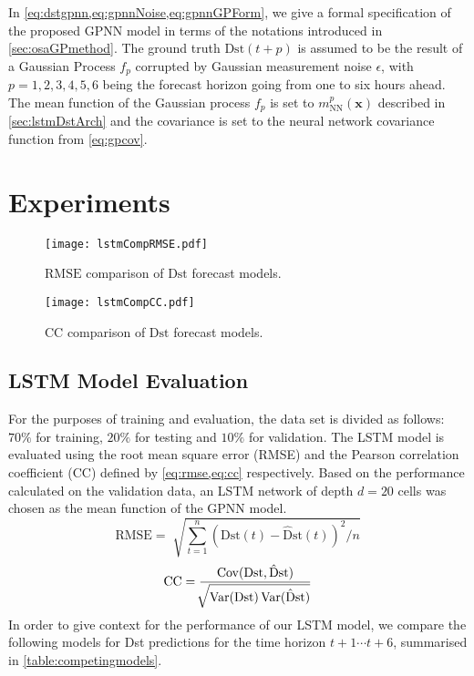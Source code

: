 In \cref{eq:dstgpnn,eq:gpnnNoise,eq:gpnnGPForm}, we give a formal specification of the proposed GPNN model in 
terms of the notations introduced in \cref{sec:osaGPmethod}. The ground truth $\mathrm{Dst}\left(t + p\right)$ 
is assumed to be the result of a Gaussian Process $f_{p}$ corrupted by Gaussian measurement noise $\epsilon$, 
with $p = {1,2,3,4,5,6}$ being the forecast horizon going from one to six hours ahead. The mean function of the 
Gaussian process $f_{p}$ is set to $m^{p}_{\text{NN}} \left( \mathbf{x} \right)$ described in 
\cref{sec:lstmDstArch} and the covariance is set to the neural network covariance function 
from \cref{eq:gpcov}. 


\section{Experiments} \label{sec:resultsgpnn}

\begin{figure}
	\texttt{[image: lstmCompRMSE.pdf]}
	\caption{$\mathrm{RMSE}$ comparison of $\mathrm{Dst}$ forecast models.}
	\label{fig:lstmRMSE}
\end{figure}

\begin{figure}
	\texttt{[image: lstmCompCC.pdf]}
	\caption{$\mathrm{CC}$ comparison of $\mathrm{Dst}$ forecast models.}
	\label{fig:lstmCC}
\end{figure}

\subsection{LSTM Model Evaluation}

For the purposes of training and evaluation, the data set is divided as follows: $70\%$ for 
training, $20\%$ for testing and $10\%$ for validation. The LSTM model is evaluated using the 
root mean square error (RMSE) and the Pearson correlation coefficient (CC) defined by 
\cref{eq:rmse,eq:cc} respectively. Based on the performance calculated on the validation data, an 
LSTM network of depth $d = 20$ cells was chosen as the mean function of the GPNN model.
%
\begin{equation}\label{eq:rmse}
 \mathrm{RMSE} = \sqrt[]{\sum_{t=1}^{n}\left( 
	 \mathrm{Dst} \left( t \right) - \mathrm{\hat{D}st}\left(t\right)
 \right) ^{2}/n}
\end{equation}
%
\begin{equation}\label{eq:cc}
 \mathrm{CC} = \frac{\operatorname*{Cov}(
	 \mathrm{Dst},\mathrm{\hat{D}st})}{
		 \sqrt[]{
			 \operatorname*{Var}(\mathrm{Dst}) \operatorname*{Var}(\mathrm{\hat{D}st})
		 }
	} 
\end{equation}
%
In order to give context for the performance of our LSTM model, we compare the following models for Dst predictions 
for the time horizon $t+1 \cdots t+6$, summarised in \cref{table:competingmodels}.

